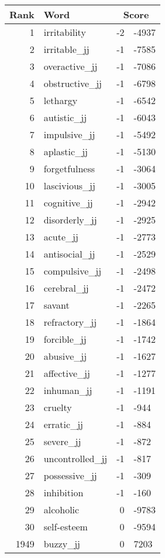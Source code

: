 \begin{longtable}[!htbp]{| rlr@{.}l |}
    \hline
    \textbf{Rank} & \textbf{Word} & \multicolumn{2}{c|}{\textbf{Score}} \\
    \hline
    \endhead
    1 & irritability & -2 & -4937 \\
    2 & irritable\_jj & -1 & -7585 \\
    3 & overactive\_jj & -1 & -7086 \\
    4 & obstructive\_jj & -1 & -6798 \\
    5 & lethargy & -1 & -6542 \\
    6 & autistic\_jj & -1 & -6043 \\
    7 & impulsive\_jj & -1 & -5492 \\
    8 & aplastic\_jj & -1 & -5130 \\
    9 & forgetfulness & -1 & -3064 \\
    10 & lascivious\_jj & -1 & -3005 \\
    11 & cognitive\_jj & -1 & -2942 \\
    12 & disorderly\_jj & -1 & -2925 \\
    13 & acute\_jj & -1 & -2773 \\
    14 & antisocial\_jj & -1 & -2529 \\
    15 & compulsive\_jj & -1 & -2498 \\
    16 & cerebral\_jj & -1 & -2472 \\
    17 & savant & -1 & -2265 \\
    18 & refractory\_jj & -1 & -1864 \\
    19 & forcible\_jj & -1 & -1742 \\
    20 & abusive\_jj & -1 & -1627 \\
    21 & affective\_jj & -1 & -1277 \\
    22 & inhuman\_jj & -1 & -1191 \\
    23 & cruelty & -1 & -944 \\
    24 & erratic\_jj & -1 & -884 \\
    25 & severe\_jj & -1 & -872 \\
    26 & uncontrolled\_jj & -1 & -817 \\
    27 & possessive\_jj & -1 & -309 \\
    28 & inhibition & -1 & -160 \\
    29 & alcoholic & 0 & -9783 \\
    30 & self-esteem & 0 & -9594 \\
    1949 & buzzy\_jj & 0 & 7203 \\

\end{longtable}
